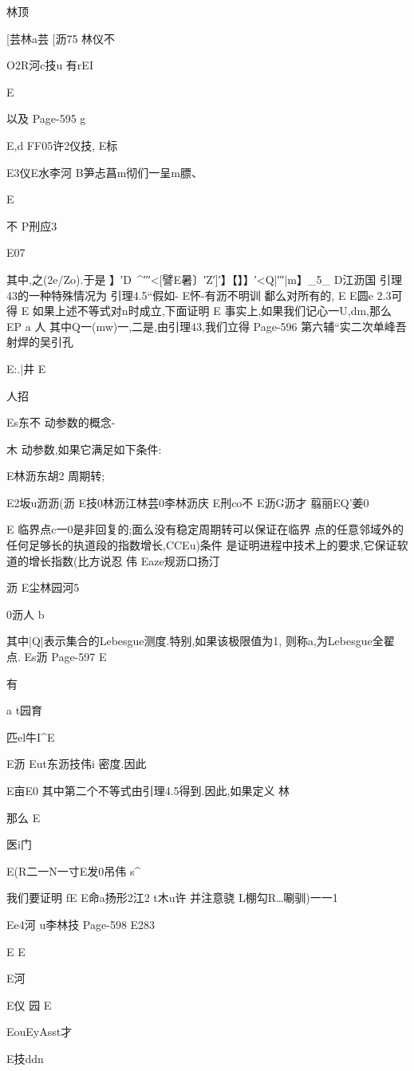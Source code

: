 {{林顶

[芸林a芸
[沥75
林仪不

O2R河c技u
有rEI

E

以及
Page-595
g

E,d
FF05许2仪技,
E标

E3仪E水李河
B笋忐菖m彻们一呈m膘、

E

不
P刑应3

E07

其中,之(2e/Zo).于是
】′D~^′′′<[譬E暑〕′Z′]′】【】】′<Q|′″|m】_5_
D江沥国
引理43的一种特殊情况为
引理4.5“假如-
E怀-有沥不明训
鄱么对所有的,
E
E圆e
2.3可得
E
如果上述不等式对n时成立,下面证明
E
事实上,如果我们记心一U,dm,那么
EP
a
人
其中Q一(mw)一,二是,由引理43,我们立得
Page-596
第六辅“实二次单峰吾射焊的吴引孔

E:.|井
E

人招

Es东不
动参数的概念-

木
动参数,如果它满足如下条件:

E林沥东胡2
周期转;

E2坂u沥沥(沥
E技0林沥江林芸0李林沥庆
E刑co不
E沥G沥才
翦丽EQ'姜0

E
临界点c一0是非回复的;面么没有稳定周期转可以保证在临界
点的任意邻域外的任何足够长的执道段的指数增长,CCEu)条件
是证明进程中技术上的要求,它保证软道的增长指数(比方说忍
伟
Eaze规沥口扬汀

沥
E尘林园河5

0沥人
b

其中|Q|表示集合的Lebesgue测度.特别,如果该极限值为1,
则称a,为Lebesgue全翟点.
Es沥
Page-597
E

有

a
t园育

匹el牛I^E

E沥
Eut东沥技伟i
密度.因此

E亩E0
其中第二个不等式由引理4.5得到.因此,如果定义
林

那么
E

医i门

E(R二一N一寸E发0吊伟
s^

我们要证明
fE
E命a扬形2江2
t木u许
并注意骁
L棚勾R…唰驯)一一1

Ee4河
u李林技
Page-598
E283

E
E

E河

E仪
园
E

EouEyAsst才

E技ddn

}}
